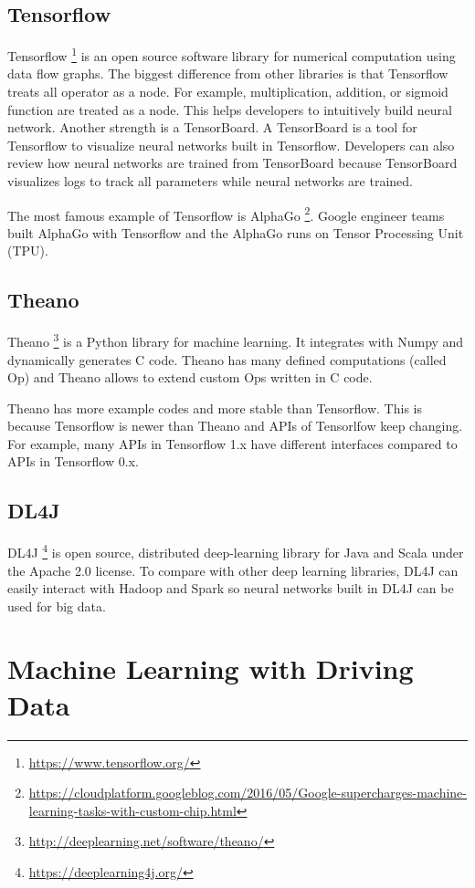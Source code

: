 \documentclass[draft,dvipsnames]{drexel-thesis}
\begin{document}
\begin{thesis}
\subsection{Tensorflow}
Tensorflow \footnote{\url{https://www.tensorflow.org/}} is an open source software library for numerical computation using data flow graphs. The biggest difference from other libraries is that Tensorflow treats all operator as a node. For example, multiplication, addition, or sigmoid function are treated as a node.  This helps developers to intuitively build neural network. Another strength is a TensorBoard. A TensorBoard is a tool for Tensorflow to visualize neural networks built in Tensorflow. Developers can also review how neural networks are trained from TensorBoard because TensorBoard visualizes logs to track all parameters while neural networks are trained.

The most famous example of Tensorflow is AlphaGo \footnote{\url{https://cloudplatform.googleblog.com/2016/05/Google-supercharges-machine-learning-tasks-with-custom-chip.html}}. Google engineer teams built AlphaGo with Tensorflow and the AlphaGo runs on Tensor Processing Unit (TPU).


\subsection{Theano}
Theano \footnote{\url{http://deeplearning.net/software/theano/}} is a Python library for machine learning. It integrates with Numpy and dynamically generates C code. Theano has many defined computations (called Op) and Theano allows to extend custom Ops written in C code.

Theano has more example codes and more stable than Tensorflow. This is because Tensorflow is newer than Theano and APIs of Tensorlfow keep changing. For example, many APIs in Tensorflow 1.x have different interfaces compared to APIs in Tensorflow 0.x.


\subsection{DL4J}
DL4J \footnote{\url{https://deeplearning4j.org/}} is open source, distributed deep-learning library for Java and Scala under the Apache 2.0 license. To compare with other deep learning libraries, DL4J can easily interact with Hadoop and Spark so neural networks built in DL4J can be used for big data.


\section{Machine Learning with Driving Data}\label{sec:MLDD}


\end{thesis}
\end{document}
